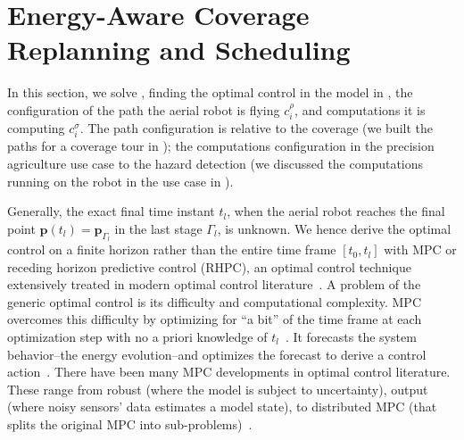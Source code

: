 

%


\section{Energy-Aware Coverage Replanning and Scheduling}
\label{sec:mpc}

In this section, we solve , finding the optimal control in the model in , the configuration of the path the aerial robot is flying $c_i^\rho$, and computations it is computing $c_i^\sigma$. The path configuration is relative to the coverage (we built the paths for a coverage tour in ); the computations configuration in the precision agriculture use case to the hazard detection (we discussed the computations running on the robot in the use case in ).

Generally, the exact final time instant $t_l$, when the aerial robot reaches the final point $\mathbf{p}(t_l)=\mathbf{p}_{\Gamma_l}$ in the last stage $\Gamma_l$, is unknown. We hence derive the optimal control on a finite horizon rather than the entire time frame $[t_0,t_l]$ with MPC or receding horizon predictive control (RHPC), an optimal control technique extensively treated in modern optimal control literature~\citep{rawlings2017model,wang2009model,camacho2007model,kwon2006receding,rossiter2004model}. A problem of the generic optimal control is its difficulty and computational complexity. MPC overcomes this difficulty by optimizing for ``a bit'' of the time frame at each optimization step with no a priori knowledge of $t_l$~\citep{camacho2007model}. It forecasts the system behavior--the energy evolution--and optimizes the forecast to derive a control action~\citep{rawlings2017model}. There have been many MPC developments in optimal control literature. These range from robust (where the model is subject to uncertainty), output (where noisy sensors' data estimates a model state), to distributed MPC (that splits the original MPC into sub-problems)~\citep{camacho2007model,rawlings2017model,kwon2006receding,rossiter2004model,wang2009model}.


